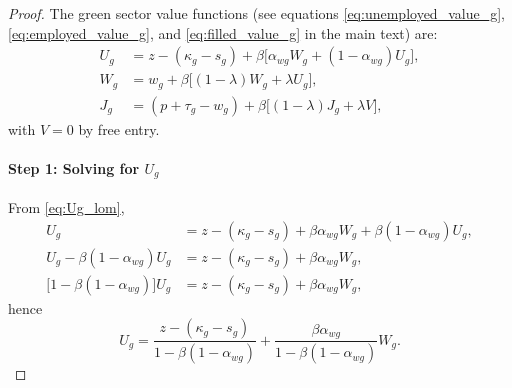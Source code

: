 \documentclass[preprint,12pt]{elsarticle}
\begin{document}
\begin{proof}
The green sector value functions (see equations \eqref{eq:unemployed_value_g}, \eqref{eq:employed_value_g}, and \eqref{eq:filled_value_g} in the main text) are:
\begin{align}
U_g &= z-(\kappa_g-s_g) + \beta\big[\alpha_{wg} W_g + (1-\alpha_{wg}) U_g\big], \label{eq:Ug_lom}\\
W_g &= w_g + \beta\big[(1-\lambda) W_g + \lambda U_g\big], \label{eq:Wg_lom}\\
J_g &= (p+\tau_g-w_g) + \beta\big[(1-\lambda) J_g + \lambda V\big], \label{eq:Jg_lom}
\end{align}
with \(V=0\) by free entry.

\paragraph{Step 1: Solving for \(U_g\)}
From \eqref{eq:Ug_lom},
\begin{align}
U_g
&= z-(\kappa_g-s_g) + \beta\alpha_{wg} W_g + \beta(1-\alpha_{wg})U_g,\\
U_g - \beta(1-\alpha_{wg})U_g
&= z-(\kappa_g-s_g) + \beta\alpha_{wg} W_g,\\
\big[1-\beta(1-\alpha_{wg})\big]U_g
&= z-(\kappa_g-s_g) + \beta\alpha_{wg} W_g,
\end{align}
hence
\begin{equation}
U_g
= \frac{z-(\kappa_g-s_g)}{1-\beta(1-\alpha_{wg})}
+ \frac{\beta\alpha_{wg}}{1-\beta(1-\alpha_{wg})}W_g.
\label{eq:Ug_linear}
\end{equation}


\end{proof}
\end{document}

